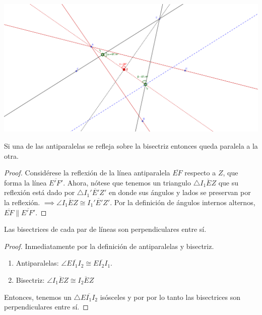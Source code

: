 




\begin{center}
	\includegraphics[scale=1]{Problemas/antiparalelas}
\end{center}


\begin{problema}
	Si una de las antiparalelas se refleja sobre la bisectriz entonces queda paralela a la otra. 
\end{problema}
\begin{proof}
	Considérese la reflexión de la línea antiparalela $\overline{EF}$ respecto a $Z$, que forma la línea $\overline{E'F'}$. Ahora, nótese que tenemos un triangulo $\triangle \overline{I_1 E Z}$ que su reflexión está dado por $\triangle \overline{I_1'E' Z'}$ en donde sus ángulos y lados se preservan por la reflexión. $\implies \angle \overline{I_1 E Z}\cong \overline{I_1'E' Z'}$. Por la definición de ángulos internos alternos, $\overline{EF}\parallel \overline{E'F'}$.
\end{proof}


\begin{problema}
	Las bisectrices de cada par de líneas son perpendiculares entre sí. 
\end{problema}
\begin{proof}
	Inmediatamente por la definición de antiparalelas y bisectriz. 
	\begin{enumerate}
		\item Antiparalelas: $\angle \overline{ E I_1 I_2}\cong \overline{ E I_2 I_1}$. 
		\item Bisectriz: $\angle \overline{ I_1 E Z}\cong \overline{I_2 E Z}$
	\end{enumerate}
Entonces, tenemos un $\triangle \overline{EI_1I_2}$ isósceles y por por lo tanto las bisectrices son perpendiculares entre sí. 
\end{proof}


